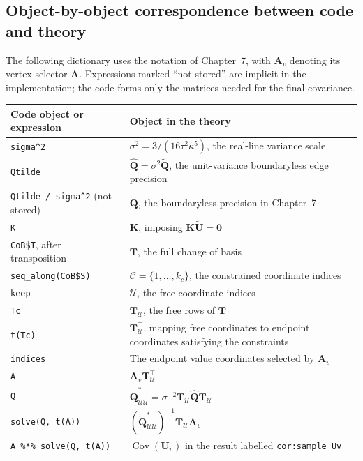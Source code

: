 \documentclass[11pt,a4paper]{article}
\theoremstyle{plain}
\theoremstyle{definition}
\begin{document}
\subsection{Object-by-object correspondence between code and theory}
\label{sec:alpha3_code_dictionary}

The following dictionary uses the notation of Chapter~7, with
$\mathbf A_v$ denoting its vertex selector $\mathbf A$. Expressions
marked ``not stored'' are implicit in the implementation; the code
forms only the matrices needed for the final covariance.

\begin{center}
\renewcommand{\arraystretch}{1.45}
\begin{tabular}{@{}p{}p{}@{}}
\hline
Code object or expression & Object in the theory \\
\hline
\texttt{sigma\^{}2}
& $\sigma^2=3/(16\tau^2\kappa^5)$, the real-line variance scale \\
\texttt{Qtilde}
& $\widehat{\mathbf Q}=\sigma^2\widetilde{\mathbf Q}$, the unit-variance
boundaryless edge precision \\
\texttt{Qtilde / sigma\^{}2} (not stored)
& $\widetilde{\mathbf Q}$, the boundaryless precision in Chapter~7 \\
\texttt{K}
& $\mathbf K$, imposing $\mathbf K\widetilde{\mathbf U}=\mathbf0$ \\
\texttt{CoB\$T}, after transposition
& $\mathbf T$, the full change of basis \\
\texttt{seq\_along(CoB\$S)}
& $\mathcal C=\{1,\ldots,k_c\}$, the constrained coordinate indices \\
\texttt{keep}
& $\mathcal U$, the free coordinate indices \\
\texttt{Tc}
& $\mathbf T_{\mathcal U}$, the free rows of $\mathbf T$ \\
\texttt{t(Tc)}
& $\mathbf T_{\mathcal U}^\top$, mapping free coordinates to endpoint
coordinates satisfying the constraints \\
\texttt{indices}
& The endpoint value coordinates selected by $\mathbf A_v$ \\
\texttt{A}
& $\mathbf A_v\mathbf T_{\mathcal U}^\top$ \\
\texttt{Q}
& $\widetilde{\mathbf Q}^{*}_{\mathcal U\mathcal U}
=\sigma^{-2}\mathbf T_{\mathcal U}\widehat{\mathbf Q}
 \mathbf T_{\mathcal U}^\top$ \\
\texttt{solve(Q, t(A))}
& $\left(\widetilde{\mathbf Q}^{*}_{\mathcal U\mathcal U}\right)^{-1}
\mathbf T_{\mathcal U}\mathbf A_v^\top$ \\
\texttt{A \%*\% solve(Q, t(A))}
& $\operatorname{Cov}(\mathbf U_v)$ in the result labelled
\texttt{cor:sample\_Uv} \\
\hline
\end{tabular}
\end{center}
\end{document}
